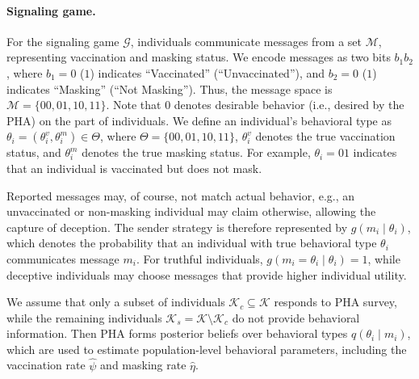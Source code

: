 \documentclass[sigconf,review]{acmart}
\begin{document}
\paragraph{Signaling game.}

For the signaling game $\mathcal{G}$, individuals communicate messages from a set $\mathcal{M}$, representing vaccination and masking status.
We encode messages as two bits $b_1b_2$, where $b_1=0$ ($1$) indicates ``Vaccinated'' (``Unvaccinated''), and $b_2=0$ ($1$) indicates ``Masking'' (``Not Masking'').
Thus, the message space is $\mathcal{M}=\{00,01,10,11\}$.
Note that $0$ denotes desirable behavior (i.e., desired by the PHA) on the part of individuals.
We define an individual's behavioral type as $\theta_i=(\theta_i^v,\theta_i^m)\in\Theta$, where $\Theta=\{00,01,10,11\}$, $\theta_i^v$ denotes the true vaccination status, and $\theta_i^m$ denotes the true masking status. For example, $\theta_i=01$ indicates that an individual is vaccinated but does not mask.

Reported messages may, of course, not match actual behavior, e.g., an unvaccinated or non-masking individual may claim otherwise, allowing the
capture of deception. 
The sender strategy is therefore represented by $g(m_i\mid \theta_i)$, which denotes the probability that an individual with true behavioral type $\theta_i$ communicates message $m_i$.
For truthful individuals, $g(m_i=\theta_i\mid\theta_i)=1$, while deceptive individuals may choose messages that provide higher individual utility.

We assume that only a subset of individuals $\mathcal{K}_c\subseteq\mathcal{K}$ responds to PHA survey, while the remaining individuals $\mathcal{K}_s=\mathcal{K}\setminus\mathcal{K}_c$ do not provide behavioral information. Then PHA forms posterior beliefs over behavioral types $q(\theta_i\mid m_i)$, which are used to estimate population-level behavioral parameters, including the vaccination rate $\widehat{\psi}$ and masking rate $\widehat{\eta}$.
\end{document}
